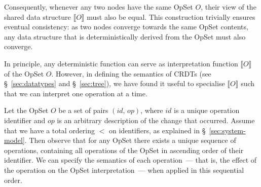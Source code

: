 Consequently, whenever any two nodes have the same OpSet $O$, their view of the shared data structure $\llbracket O \rrbracket$ must also be equal.
This construction trivially ensures eventual consistency: as two nodes converge towards the same OpSet contents, any data structure that is deterministically derived from the OpSet must also converge.

In principle, any deterministic function can serve as interpretation function $\llbracket O \rrbracket$ of the OpSet $O$.
However, in defining the semantics of CRDTs (see \S~\ref{sec:datatypes} and \S~\ref{sec:tree}), we have found it useful to specialise $\llbracket O \rrbracket$ such that we can interpret one operation at a time.

Let the OpSet $O$ be a set of pairs $(\mathit{id},\, \mathit{op})$, where $\mathit{id}$ is a unique operation identifier and $\mathit{op}$ is an arbitrary description of the change that occurred.
Assume that we have a total ordering $<$ on identifiers, as explained in \S~\ref{sec:system-model}.
Then observe that for any OpSet there exists a unique sequence of operations, containing all operations of the OpSet in ascending order of their identifier.
We can specify the semantics of each operation~--- that is, the effect of the operation on the OpSet interpretation~--- when applied in this sequential order.

